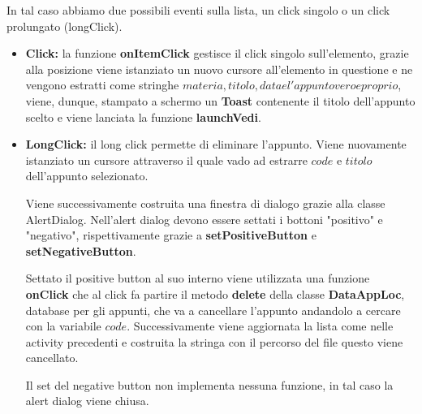 \documentclass[a4paper, 50pt, twoside]{article}
\begin{document}
In tal caso abbiamo due possibili eventi sulla lista, un click singolo o un click prolungato (longClick).
\begin{itemize}
\item \textbf{Click:} la funzione \textbf{onItemClick} gestisce il click singolo sull'elemento, grazie alla posizione viene istanziato un nuovo cursore all'elemento in questione e ne vengono estratti come stringhe $materia, titolo, data e l'appunto vero e proprio$, viene, dunque, stampato a schermo un \textbf{Toast} contenente il titolo dell'appunto scelto e viene lanciata la funzione \textbf{launchVedi}.
\item \textbf{LongClick:} il long click permette di eliminare l'appunto. Viene nuovamente istanziato un cursore attraverso il quale vado ad estrarre $code$ e $titolo$ dell'appunto selezionato.

Viene successivamente costruita una finestra di dialogo grazie alla classe AlertDialog. Nell'alert dialog devono essere settati i bottoni "positivo" e "negativo", rispettivamente grazie a \textbf{setPositiveButton} e \textbf{setNegativeButton}.

Settato il positive button al suo interno viene utilizzata una funzione \textbf{onClick} che al click fa partire il metodo \textbf{delete} della classe \textbf{DataAppLoc}, database per gli appunti, che va a cancellare l'appunto andandolo a cercare con la variabile $code$. Successivamente viene aggiornata la lista come nelle activity precedenti e costruita la stringa con il percorso del file questo viene cancellato.

Il set del negative button non implementa nessuna funzione, in tal caso la alert dialog viene chiusa.
\end{itemize}
\end{document}

